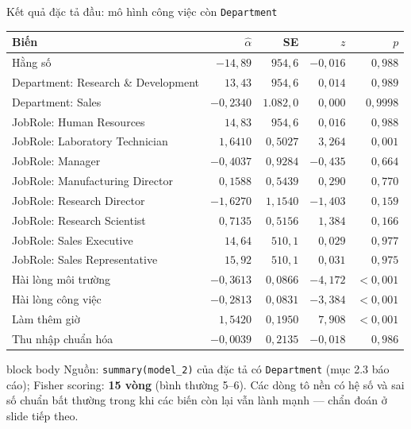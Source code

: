 \documentclass[10pt,aspectratio=169]{beamer}
\begin{document}
\begin{frame}{Kết quả đặc tả đầu: mô hình công việc còn \texttt{Department}}
  \centering\tiny
  \renewcommand{\arraystretch}{1.02}
  \begin{tabular}{lrrrr}
    \toprule
    \textbf{Biến} & $\hat\alpha$ & \textbf{SE} & $z$ & $p$\\
    \midrule
    \rowcolor{HCMUSLight}
    Hằng số & $-14{,}89$ & $954{,}6$ & $-0{,}016$ & $0{,}988$\\
    \rowcolor{HCMUSLight}
    Department: Research \& Development & $13{,}43$ & $954{,}6$ & $0{,}014$ & $0{,}989$\\
    \rowcolor{HCMUSLight}
    Department: Sales & $-0{,}2340$ & $1.082{,}0$ & $0{,}000$ & $0{,}9998$\\
    \rowcolor{HCMUSLight}
    JobRole: Human Resources & $14{,}83$ & $954{,}6$ & $0{,}016$ & $0{,}988$\\
    JobRole: Laboratory Technician & $1{,}6410$ & $0{,}5027$ & $3{,}264$ & $0{,}001$\\
    JobRole: Manager & $-0{,}4037$ & $0{,}9284$ & $-0{,}435$ & $0{,}664$\\
    JobRole: Manufacturing Director & $0{,}1588$ & $0{,}5439$ & $0{,}290$ & $0{,}770$\\
    JobRole: Research Director & $-1{,}6270$ & $1{,}1540$ & $-1{,}403$ & $0{,}159$\\
    JobRole: Research Scientist & $0{,}7135$ & $0{,}5156$ & $1{,}384$ & $0{,}166$\\
    \rowcolor{HCMUSLight}
    JobRole: Sales Executive & $14{,}64$ & $510{,}1$ & $0{,}029$ & $0{,}977$\\
    \rowcolor{HCMUSLight}
    JobRole: Sales Representative & $15{,}92$ & $510{,}1$ & $0{,}031$ & $0{,}975$\\
    Hài lòng môi trường & $-0{,}3613$ & $0{,}0866$ & $-4{,}172$ & $<0{,}001$\\
    Hài lòng công việc & $-0{,}2813$ & $0{,}0831$ & $-3{,}384$ & $<0{,}001$\\
    Làm thêm giờ & $1{,}5420$ & $0{,}1950$ & $7{,}908$ & $<0{,}001$\\
    Thu nhập chuẩn hóa & $-0{,}0039$ & $0{,}2135$ & $-0{,}018$ & $0{,}986$\\
    \bottomrule
  \end{tabular}
  \vspace{0.16cm}
  \begin{beamercolorbox}[sep=0.11cm,rounded=true]{block body}
    \scriptsize
    Nguồn: \texttt{summary(model\_2)} của đặc tả có \texttt{Department}
    (mục 2.3 báo cáo); Fisher scoring: \textbf{15 vòng} (bình thường 5--6).
    Các dòng tô nền có hệ số và sai số chuẩn bất thường trong khi các biến
    còn lại vẫn lành mạnh --- chẩn đoán ở slide tiếp theo.
  \end{beamercolorbox}
\end{frame}
\end{document}

